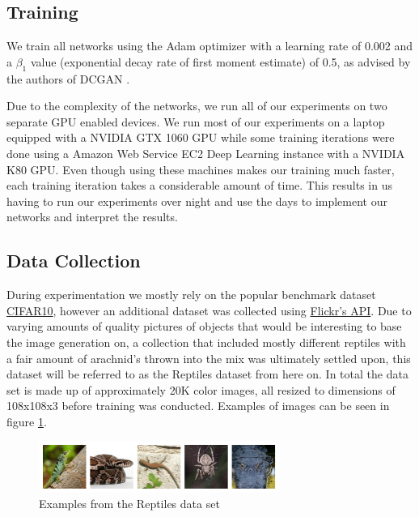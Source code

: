 \subsection{Training}
We train all networks using the Adam optimizer \cite{DBLP:journals/corr/KingmaB14} with a learning rate of 0.002 and a $\beta_1$ value (exponential decay rate of first moment estimate) of 0.5, as advised by the authors of DCGAN \cite{DBLP:journals/corr/RadfordMC15}.

Due to the complexity of the networks, we run all of our experiments on two separate GPU enabled devices. We run most of our experiments on a laptop equipped with a NVIDIA GTX 1060 GPU while some training iterations were done using a Amazon Web Service EC2 Deep Learning instance with a NVIDIA K80 GPU. Even though using these machines makes our training much faster, each training iteration takes a considerable amount of time. This results in us having to run our experiments over night and use the days to implement our networks and interpret the results. 

\subsection{Data Collection}

During experimentation we mostly rely on the popular benchmark dataset \href{https://www.cs.toronto.edu/~kriz/cifar.html}{CIFAR10}, however an additional dataset was collected using \href{https://www.flickr.com/services/api/}{Flickr's API}. Due to varying amounts of quality pictures of objects that would be interesting to base the image generation on, a collection that included mostly different reptiles with a fair amount of arachnid's thrown into the mix was ultimately settled upon, this dataset will be referred to as the Reptiles dataset from here on. In total the data set is made up of approximately 20K color images, all resized to dimensions of 108x108x3 before training was conducted. Examples of images can be seen in figure \ref{fig:reptiles}.%
\begin{figure}[H]
\centering
\includegraphics[width=0.7\textwidth]{figures/reptiles.png}
\caption{Examples from the Reptiles data set}
\label{fig:reptiles}
\end{figure}